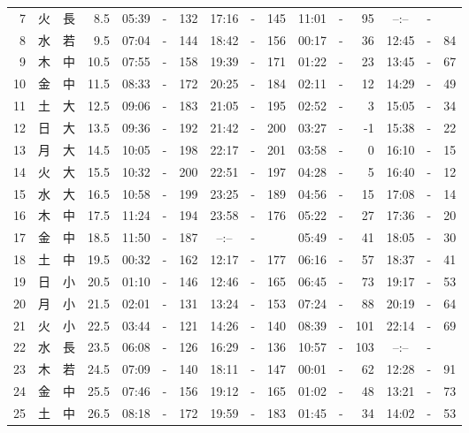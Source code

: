 \documentclass[12pt.a4j]{jsarticle}
\begin{document}
\begin{center}
\begin{table}[ht]
\begin{tabular}{|rc|cr|ccrccr|ccrccr|}
 7 & 火 & 長 &  8.5 &  05:39 &-& 132  &  17:16 &-& 145  &   11:01 &-&  95  &   --:-- &-&     \\
 8 & 水 & 若 &  9.5 &  07:04 &-& 144  &  18:42 &-& 156  &   00:17 &-&  36  &   12:45 &-&  84  \\
 9 & 木 & 中 & 10.5 &  07:55 &-& 158  &  19:39 &-& 171  &   01:22 &-&  23  &   13:45 &-&  67  \\
10 & 金 & 中 & 11.5 &  08:33 &-& 172  &  20:25 &-& 184  &   02:11 &-&  12  &   14:29 &-&  49  \\
11 & 土 & 大 & 12.5 &  09:06 &-& 183  &  21:05 &-& 195  &   02:52 &-&   3  &   15:05 &-&  34  \\
12 & 日 & 大 & 13.5 &  09:36 &-& 192  &  21:42 &-& 200  &   03:27 &-&  -1  &   15:38 &-&  22  \\
13 & 月 & 大 & 14.5 &  10:05 &-& 198  &  22:17 &-& 201  &   03:58 &-&   0  &   16:10 &-&  15  \\
14 & 火 & 大 & 15.5 &  10:32 &-& 200  &  22:51 &-& 197  &   04:28 &-&   5  &   16:40 &-&  12  \\
15 & 水 & 大 & 16.5 &  10:58 &-& 199  &  23:25 &-& 189  &   04:56 &-&  15  &   17:08 &-&  14  \\
16 & 木 & 中 & 17.5 &  11:24 &-& 194  &  23:58 &-& 176  &   05:22 &-&  27  &   17:36 &-&  20  \\
17 & 金 & 中 & 18.5 &  11:50 &-& 187  &  --:-- &-&     &   05:49 &-&  41  &   18:05 &-&  30  \\
18 & 土 & 中 & 19.5 &  00:32 &-& 162  &  12:17 &-& 177  &   06:16 &-&  57  &   18:37 &-&  41  \\
19 & 日 & 小 & 20.5 &  01:10 &-& 146  &  12:46 &-& 165  &   06:45 &-&  73  &   19:17 &-&  53  \\
20 & 月 & 小 & 21.5 &  02:01 &-& 131  &  13:24 &-& 153  &   07:24 &-&  88  &   20:19 &-&  64  \\
21 & 火 & 小 & 22.5 &  03:44 &-& 121  &  14:26 &-& 140  &   08:39 &-& 101  &   22:14 &-&  69  \\
22 & 水 & 長 & 23.5 &  06:08 &-& 126  &  16:29 &-& 136  &   10:57 &-& 103  &   --:-- &-&     \\
23 & 木 & 若 & 24.5 &  07:09 &-& 140  &  18:11 &-& 147  &   00:01 &-&  62  &   12:28 &-&  91  \\
24 & 金 & 中 & 25.5 &  07:46 &-& 156  &  19:12 &-& 165  &   01:02 &-&  48  &   13:21 &-&  73  \\
25 & 土 & 中 & 26.5 &  08:18 &-& 172  &  19:59 &-& 183  &   01:45 &-&  34  &   14:02 &-&  53  \\

\end{tabular}
\end{table}
\end{center}
\end{document}

